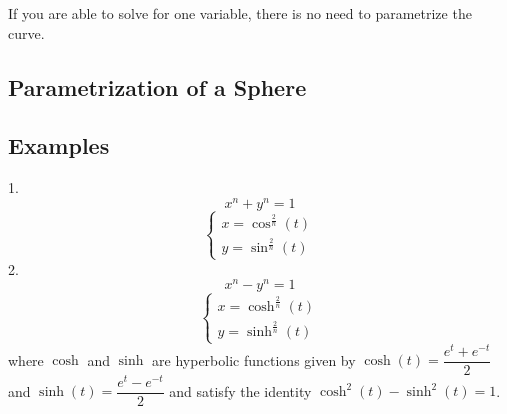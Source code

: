If you are able to solve for one variable, there is no need to parametrize the curve.
\subsection{Parametrization of a Sphere}

\pagebreak
\subsection{Examples}
1.
\[
x^n + y^n = 1
\]
\[
\begin{cases}
    x = \cos^\frac{2}{n}(t)\\
    y = \sin^\frac{2}{n}(t)
\end{cases}
\]
2.
\[
x^n - y^n = 1
\]
\[
\begin{cases}
    x = \cosh^\frac{2}{n}(t)\\
    y = \sinh^\frac{2}{n}(t)
\end{cases}
\]
where $\cosh$ and $\sinh$ are hyperbolic functions given by $\cosh(t) = \dfrac{e^t + e^{-t}}{2}$ and $\sinh(t) = \dfrac{e^t - e^{-t}}{2}$ and satisfy the identity $\cosh^2(t) - \sinh^2(t) = 1$.